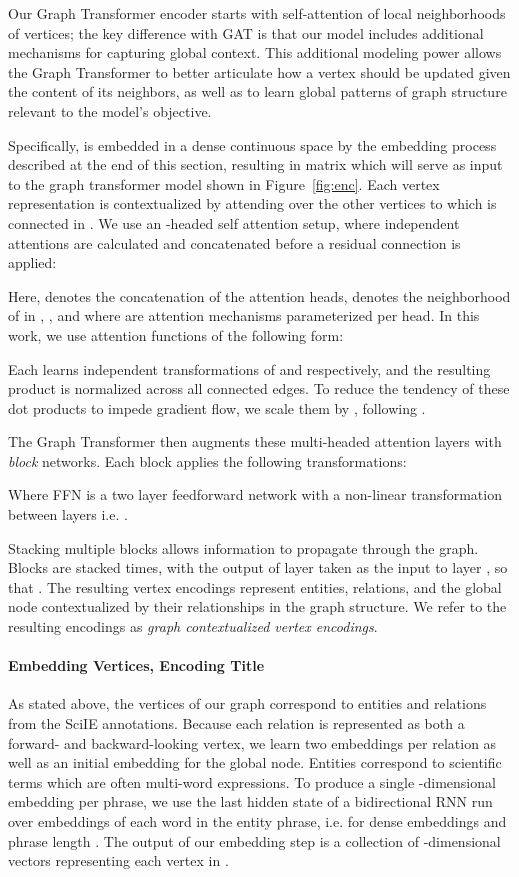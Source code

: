 \documentclass[11pt,a4paper]{article}
\begin{document}
Our Graph Transformer encoder starts with self-attention of local neighborhoods of vertices; the key difference with GAT is that our model includes additional mechanisms for capturing global context. 
This additional modeling power allows the Graph Transformer to better articulate how a vertex should be updated given the content of its neighbors, as well as to learn global patterns of graph structure relevant to the model's objective.

Specifically,  is embedded in a dense continuous space by the embedding process described at the end of this section, resulting in matrix  which will serve as input to the graph transformer model shown in Figure~\ref{fig:enc}.
Each vertex representation  is contextualized by attending over the other vertices to which  is connected in .  
We use an -headed self attention setup, where  independent attentions are calculated and concatenated before a residual connection is applied:

Here,  denotes the concatenation of the  attention heads,  denotes the neighborhood of  in , , and where  are attention mechanisms parameterized per head.
In this work, we use attention functions of the  following form:

Each  learns independent transformations  of  and  respectively, and the resulting product is normalized across all connected edges. 
To reduce the tendency of these dot products to impede gradient flow, we scale them by , following \citet{vaswani2017attention}.

The Graph Transformer then augments these  multi-headed attention layers with {\it block} networks. 
Each block applies the following transformations: 

Where FFN is a two layer feedforward network with a non-linear transformation  between layers i.e. . 

Stacking multiple blocks allows information to propagate through the graph.
Blocks are stacked  times, with the output of layer  taken as the input to layer , so that .
The resulting vertex encodings  represent entities, relations, and the global node contextualized by their relationships in the graph structure. 
We refer to the resulting encodings as {\it graph contextualized vertex encodings}.

\paragraph{Embedding Vertices, Encoding Title}
As stated above, the vertices of our graph correspond to entities and relations from the SciIE annotations.
Because each relation is represented as both a forward- and backward-looking vertex, we learn two embeddings per relation as well as an initial embedding for the global node.
Entities correspond to scientific terms which are often multi-word expressions. 
To produce a single -dimensional embedding per phrase, we use the last hidden state of a bidirectional RNN run over embeddings of each word in the entity phrase, i.e.  for dense embeddings  and phrase length . 
The output of our embedding step is a collection  of -dimensional vectors representing each vertex in .
\end{document}
